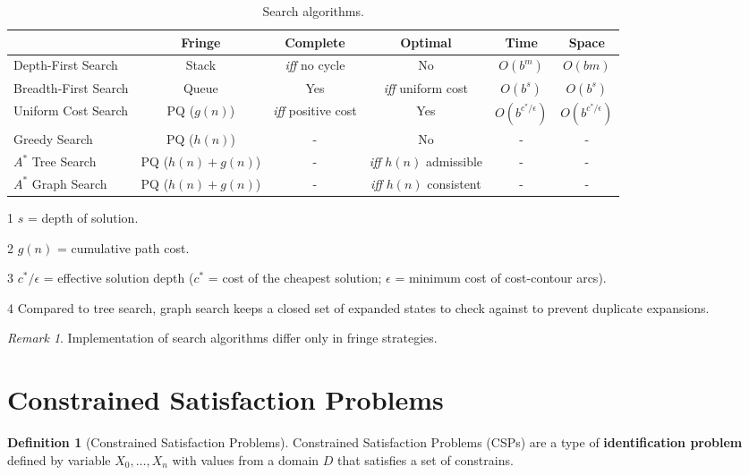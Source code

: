 \documentclass[11pt]{article}
\theoremstyle{definition}
\newtheorem{definition}{Definition}[section]
\theoremstyle{remark}
\newtheorem*{remark}{Remark}
\begin{document}
\clearpage
\begin{table}[ht]
\centering
\begin{adjustbox}{width={\textwidth}}
\begin{threeparttable}
\caption{Search algorithms.}
\begin{tabular}[t]{lccccc}
\hline
& Fringe & Complete & Optimal & Time & Space \\ 
\hline
Depth-First Search & Stack & \textit{iff} no cycle & No & $O(b^m)$ & $O(bm)$ \\ 
Breadth-First Search & Queue & Yes & \textit{iff} uniform cost & $O(b^s)$\tnote{1} & $O(b^s)$\tnote{1} \\ 
Uniform Cost Search & PQ ($g(n)$)\tnote{2} & \textit{iff} positive cost & Yes & $O(b^{c^*/\epsilon})$\tnote{3} & $O(b^{c^*/\epsilon})$\tnote{3} \\ 
Greedy Search & PQ ($h(n)$)& - & No & - & - \\ 
$A^*$ Tree Search & PQ ($h(n)+g(n)$)& - & \textit{iff} $h(n)$ admissible & - & - \\ 
$A^*$ Graph Search\tnote{4} & PQ ($h(n)+g(n)$) & - & \textit{iff} $h(n)$ consistent & - & - \\ 
\hline
\end{tabular}
\quad
\begin{tablenotes}\footnotesize
\item[1] $s$ = depth of solution.
\item[2] $g(n)$ = cumulative path cost.
\item[3] $c^*/\epsilon$ = effective solution depth ($c^*$ = cost of the cheapest solution; $\epsilon$ = minimum cost of cost-contour arcs).
\item[4] Compared to tree search, graph search keeps a closed set of expanded states to check against to prevent duplicate expansions.
\end{tablenotes}
\end{threeparttable}
\end{adjustbox}
\end{table}

\begin{remark}
Implementation of search algorithms differ only in fringe strategies.
\end{remark}

\newpage
\section{Constrained Satisfaction Problems}
\begin{definition}[Constrained Satisfaction Problems]
Constrained Satisfaction Problems (CSPs) are a type of \textbf{identification problem} defined by variable $X_0, \dots, X_n$ with values from a domain $D$ that satisfies a set of constrains.
\end{definition}
\end{document}
